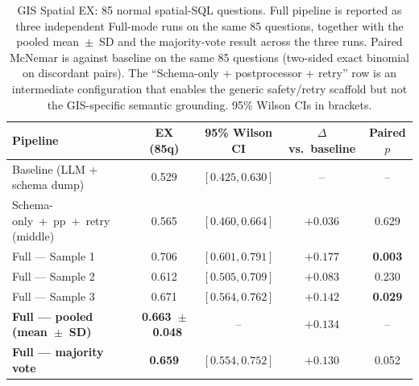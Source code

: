 \documentclass[11pt]{article}
\begin{document}
\begin{table}[t]
\centering
\caption{GIS Spatial EX: 85 normal spatial-SQL questions. Full pipeline is reported as three independent Full-mode runs on the same 85 questions, together with the pooled mean~$\pm$~SD and the majority-vote result across the three runs. Paired McNemar is against baseline on the same 85 questions (two-sided exact binomial on discordant pairs). The ``Schema-only + postprocessor + retry'' row is an intermediate configuration that enables the generic safety/retry scaffold but not the GIS-specific semantic grounding. 95\% Wilson CIs in brackets.}
\label{tab:gis-spatial}
\begin{tabular}{lcccc}
\toprule
Pipeline & EX (85q) & 95\% Wilson CI & $\Delta$ vs.\ baseline & Paired $p$ \\
\midrule
Baseline (LLM + schema dump)            & 0.529 & $[0.425, 0.630]$ & --       & --     \\
Schema-only~+~pp~+~retry (middle)       & 0.565 & $[0.460, 0.664]$ & $+0.036$ & 0.629 \\
Full --- Sample 1                       & 0.706 & $[0.601, 0.791]$ & $+0.177$ & \textbf{0.003} \\
Full --- Sample 2                       & 0.612 & $[0.505, 0.709]$ & $+0.083$ & 0.230 \\
Full --- Sample 3                       & 0.671 & $[0.564, 0.762]$ & $+0.142$ & \textbf{0.029} \\
\midrule
\textbf{Full --- pooled (mean~$\pm$~SD)} & \textbf{0.663~$\pm$~0.048} & -- & $+0.134$ & -- \\
\textbf{Full --- majority vote}          & \textbf{0.659} & $[0.554, 0.752]$ & $+0.130$ & 0.052 \\
\bottomrule
\end{tabular}
\end{table}
\end{document}
